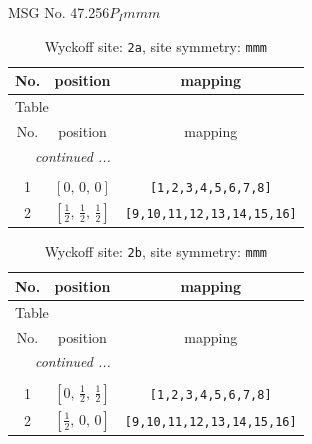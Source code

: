 \documentclass[fleqn,8pt]{jsarticle}
\begin{document}
\setcounter{MaxMatrixCols}{32}

\renewcommand{\tablename}{Table~}
\renewcommand{\figurename}{Figure~}
\begin{center}
\LARGE
MSG No. 47.256\quad$P_{I}mmm$
\end{center}
\renewcommand{\arraystretch}{1.2}
\begin{longtable}{ccc}
\caption{Wyckoff site: {\tt 2a}, site symmetry: {\tt mmm}}
 \\
 \hline \hline
No. & position & mapping \\ \hline \endfirsthead

\multicolumn{2}{l}{\tablename\ \thetable{}} \\
 \hline \hline
No. & position & mapping \\ \hline \endhead

 \hline \hline
\multicolumn{2}{r}{\footnotesize\it continued ...} \\ \endfoot

 \hline \hline
\multicolumn{2}{r}{} \\ \endlastfoot

1 & $\left[ 0,\, 0,\, 0 \right]$ & {\tt [1,2,3,4,5,6,7,8]} \\ \hline
2 & $\left[ \frac{1}{2},\, \frac{1}{2},\, \frac{1}{2} \right]$ & {\tt [9,10,11,12,13,14,15,16]} \\
\end{longtable}
\renewcommand{\arraystretch}{1.2}
\begin{longtable}{ccc}
\caption{Wyckoff site: {\tt 2b}, site symmetry: {\tt mmm}}
 \\
 \hline \hline
No. & position & mapping \\ \hline \endfirsthead

\multicolumn{2}{l}{\tablename\ \thetable{}} \\
 \hline \hline
No. & position & mapping \\ \hline \endhead

 \hline \hline
\multicolumn{2}{r}{\footnotesize\it continued ...} \\ \endfoot

 \hline \hline
\multicolumn{2}{r}{} \\ \endlastfoot

1 & $\left[ 0,\, \frac{1}{2},\, \frac{1}{2} \right]$ & {\tt [1,2,3,4,5,6,7,8]} \\ \hline
2 & $\left[ \frac{1}{2},\, 0,\, 0 \right]$ & {\tt [9,10,11,12,13,14,15,16]} \\
\end{longtable}
\end{document}
